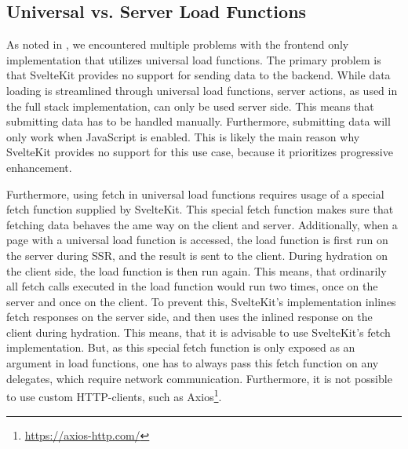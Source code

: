 \subsection{Universal vs. Server Load Functions}
\label{sec:evaluation-universal}
As noted in , we encountered multiple problems with the frontend only implementation that utilizes universal load functions. The primary problem is that SvelteKit provides no support for sending data to the backend. While data loading is streamlined through universal load functions, server actions, as used in the full stack implementation, can only be used server side. This means that submitting data has to be handled manually. Furthermore, submitting data will only work when JavaScript is enabled. This is likely the main reason why SvelteKit provides no support for this use case, because it prioritizes progressive enhancement.







Furthermore, using fetch in universal load functions requires usage of a special fetch function supplied by SvelteKit. This special fetch function makes sure that fetching data behaves the ame way on the client and server. Additionally, when a page with a universal load function is accessed, the load function is first run on the server during SSR, and the result is sent to the client. During hydration on the client side, the load function is then run again. This means, that ordinarily all fetch calls executed in the load function would run two times, once on the server and once on the client. To prevent this, SvelteKit's implementation inlines fetch responses on the server side, and then uses the inlined response on the client during hydration. This means, that it is advisable to use SvelteKit's fetch implementation. But, as this special fetch function is only exposed as an argument in load functions, one has to always pass this fetch function on any delegates, which require network communication. Furthermore, it is not possible to use custom HTTP-clients, such as Axios\footnote{\url{https://axios-http.com/}}.

